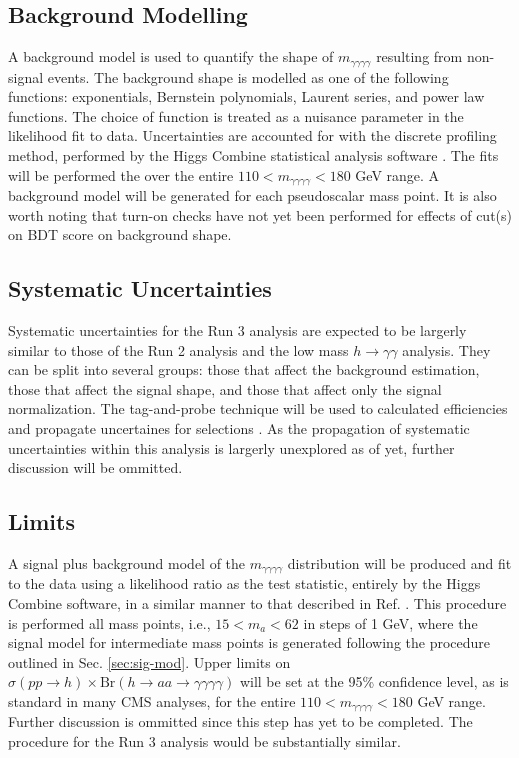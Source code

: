 \documentclass[12pt]{article}
\begin{document}
\subsection{Background Modelling}
A background model is used to quantify the shape of $m_{\gamma\gamma\gamma\gamma}$ resulting from non-signal events. The background shape is modelled as one of the following functions: exponentials, Bernstein polynomials, Laurent series, and power law functions. The choice of function is treated as a nuisance parameter in the likelihood fit to data. Uncertainties are accounted for with the discrete profiling method, performed by the Higgs Combine statistical analysis software \cite{discrete-profiling, higgs-combine}. The fits will be performed the over the entire $110 < m_{\gamma\gamma\gamma\gamma} < 180$ GeV range. A background model will be generated for each pseudoscalar mass point. It is also worth noting that turn-on checks have not yet been performed for effects of cut(s) on BDT score on background shape.\par

\subsection{Systematic Uncertainties}
Systematic uncertainties for the Run 3 analysis are expected to be largerly similar to those of the Run 2 analysis and the low mass $h\rightarrow \gamma\gamma$ analysis. They can be split into several groups: those that affect the background estimation, those that affect the signal shape, and those that affect only the signal normalization. The tag-and-probe technique will be used to calculated efficiencies and propagate uncertaines for selections \cite{Chatrchyan2011}. As the propagation of systematic uncertainties within this analysis is largerly unexplored as of yet, further discussion will be ommitted.\par

\subsection{Limits}
A signal plus background model of the $m_{\gamma\gamma\gamma\gamma}$ distribution will be produced and fit to the data using a likelihood ratio as the test statistic, entirely by the Higgs Combine software, in a similar manner to that described in Ref. \cite{higgs-search-2012}. This procedure is performed all mass points, i.e., $15 < m_{a} < 62$ in steps of 1 GeV, where the signal model for intermediate mass points is generated following the procedure outlined in Sec. \ref{sec:sig-mod}. Upper limits on $\sigma(pp \rightarrow h) \times \mathrm{Br}(h\rightarrow aa \rightarrow \gamma\gamma\gamma\gamma)$ will be set at the 95\% confidence level, as is standard in many CMS analyses, for the entire $110 < m_{\gamma\gamma\gamma\gamma} < 180$ GeV range. Further discussion is ommitted since this step has yet to be completed. The procedure for the Run 3 analysis would be substantially similar.\par
\end{document}
